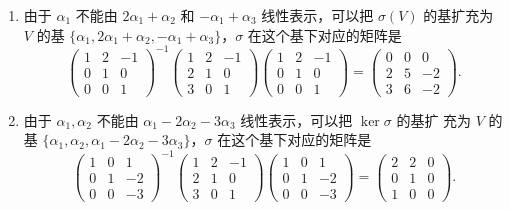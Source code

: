 \begin{solution}
\begin{enumerate}
        \item 由于 $\alpha_{1}$ 不能由 $2 \alpha_{1}+\alpha_{2}$ 和 $-\alpha_{1}+\alpha_{3}$ 线性表示，可以把 $\sigma(V)$ 的基扩充为 $V$ 的基 $\{\alpha_{1}, 2 \alpha_{1}+\alpha_{2}, -\alpha_{1}+\alpha_{3}\}$，$\sigma$ 在这个基下对应的矩阵是
              \[\begin{pmatrix}
                      1 & 2 & -1 \\
                      0 & 1 & 0  \\
                      0 & 0 & 1
                  \end{pmatrix}^{-1}\begin{pmatrix}
                      1 & 2 & -1 \\
                      2 & 1 & 0  \\
                      3 & 0 & 1
                  \end{pmatrix}\begin{pmatrix}
                      1 & 2 & -1 \\
                      0 & 1 & 0  \\
                      0 & 0 & 1
                  \end{pmatrix}=\begin{pmatrix}
                      0 & 0 & 0  \\
                      2 & 5 & -2 \\
                      3 & 6 & -2
                  \end{pmatrix}.\]

        \item 由于 $\alpha_{1}, \alpha_{2}$ 不能由 $\alpha_{1}-2 \alpha_{2}-3 \alpha_{3}$ 线性表示，可以把 $\ker \sigma$ 的基扩 充为 $V$ 的基 $\{\alpha_{1}, \alpha_{2}, \alpha_{1}-2 \alpha_{2}-3 \alpha_{3}\}$，$\sigma$ 在这个基下对应的矩阵是
              \[\begin{pmatrix}
                      1 & 0 & 1  \\
                      0 & 1 & -2 \\
                      0 & 0 & -3
                  \end{pmatrix}^{-1}\begin{pmatrix}
                      1 & 2 & -1 \\
                      2 & 1 & 0  \\
                      3 & 0 & 1
                  \end{pmatrix}\begin{pmatrix}
                      1 & 0 & 1  \\
                      0 & 1 & -2 \\
                      0 & 0 & -3
                  \end{pmatrix}=\begin{pmatrix}
                      2 & 2 & 0 \\
                      0 & 1 & 0 \\
                      1 & 0 & 0
                  \end{pmatrix}.\]
    \end{enumerate}
\end{solution}

